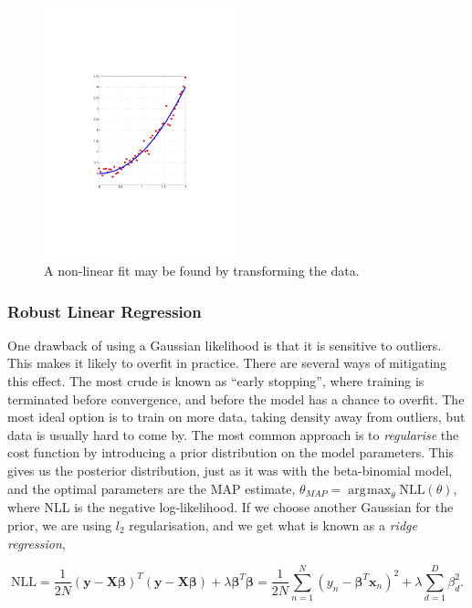 \documentclass[11pt]{amsart}
\DeclareMathOperator*{\argmax}{\arg\!\max}
\begin{document}
\begin{figure}[!ht]
\centering
\includegraphics[width=0.5\textwidth]{Figures/quadraticfit.pdf}
\caption{A non-linear fit may be found by transforming the data.}
\label{fig:quadraticfit}
\end{figure}

\subsubsection{Robust Linear Regression}

One drawback of using a Gaussian likelihood is that it is sensitive to outliers. This makes it likely to overfit in practice. There are several ways of mitigating this effect. The most crude is known as ``early stopping'', where training is terminated before convergence, and before the model has a chance to overfit. The most ideal option is to train on more data, taking density away from outliers, but data is usually hard to come by. The most common approach is to \emph{regularise} the cost function by introducing a prior distribution on the model parameters. This gives us the posterior distribution, just as it was with the beta-binomial model, and the optimal parameters are the MAP estimate, $\theta_{MAP} = \argmax_{\theta} \text{NLL}(\theta)$, where NLL is the negative log-likelihood. If we choose another Gaussian for the prior, we are using $l_2$ regularisation, and we get what is known as a \emph{ridge regression},

$$\text{NLL} = \frac{1}{2N}(\mathbf{y} - \mathbf{X}\boldsymbol\beta)^T(\mathbf{y} - \mathbf{X}\boldsymbol\beta) + \lambda\boldsymbol\beta^T\boldsymbol\beta = \frac{1}{2N}\sum_{n=1}^N(y_n - \boldsymbol\beta^T\mathbf{x}_n)^2 + \lambda\sum_{d=1}^D\beta_d^2.$$
\end{document}

